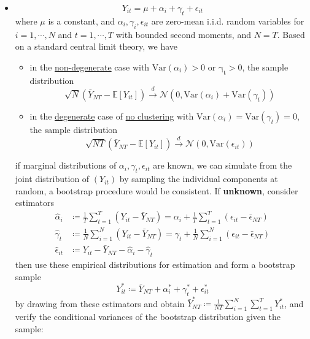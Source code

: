 \documentclass[twoside]{article}
\begin{document}
\begin{itemize}
    \item {}
    $$ Y_{it} = \mu + \alpha_i + \gamma_t + \epsilon_{it} $$
    where $\mu$ is a constant, and $\alpha_i,\gamma_i,\epsilon_{it}$ are zero-mean i.i.d. random variables for $i=1,\cdots,N$ and $t=1,\cdots,T$ with bounded second moments, and $N=T$. Based on a standard central limit theory, we have 
    \begin{itemize}
        \item in the \underline{non-degenerate} case with $\mathrm{Var}(\alpha_i) >0$ or $\mathrm{\gamma_t}>0$, the sample distribution $$ \sqrt{N}\left(\bar{Y}_{NT}-\mathbb{E}\left[Y_{it}\right]\right) \xrightarrow{d} \mathcal{N}\left(0,\mathrm{Var}(\alpha_i) + \mathrm{Var}(\gamma_t)\right) $$
        \item in the \underline{degenerate} case of \underline{no clustering} with $\mathrm{Var}(\alpha_i) = \mathrm{Var}(\gamma_t) =0$, the sample distribution $$ \sqrt{NT}\left(\bar{Y}_{NT}-\mathbb{E}\left[Y_{it}\right]\right) \xrightarrow{d} \mathcal{N}\left(0,\mathrm{Var}(\epsilon_{it})\right) $$ 
    \end{itemize}
    if marginal distributions of $\alpha_i,\gamma_t,\epsilon_{it}$ are known, we can simulate from the joint distribution of $\left(Y_{it}\right)$ by sampling the individual components at random, a bootstrap procedure would be consistent. If \textbf{unknown}, consider estimators 
    \begin{align*}
        \hat{\alpha}_i & \coloneq \frac{1}{T}\sum^T_{t=1}\left(Y_{it}-\bar{Y}_{NT}\right) = \alpha_i + \frac{1}{T}\sum^T_{t=1} \left(\epsilon_{it}-\bar{\epsilon}_{NT}\right)\\
        \hat{\gamma}_t & \coloneq \frac{1}{N}\sum^N_{i=1}\left(Y_{it}-\bar{Y}_{NT}\right) = \gamma_t + \frac{1}{N}\sum^N_{i=1} \left(\epsilon_{it}-\bar{\epsilon}_{NT}\right)\\
        \hat{\epsilon}_{it} & \coloneq Y_{it} - \bar{Y}_{NT} -\hat{\alpha}_i -\hat{\gamma}_t
    \end{align*}
    then use these empirical distributions for estimation and form a bootstrap sample 
    $$ Y^*_{it} \coloneq \bar{Y}_{NT} + \alpha^*_i + \gamma^*_t + \epsilon^*_{it} $$
    by drawing from these estimators and obtain $\bar{Y}^*_{NT}\coloneq \frac{1}{NT}\sum^N_{i=1}\sum^T_{t=1}Y^*_{it}$, and verify the conditional variances of the bootstrap distribution given the sample:
    \begin{align*}

\end{align*}
\end{itemize}
\end{document}
